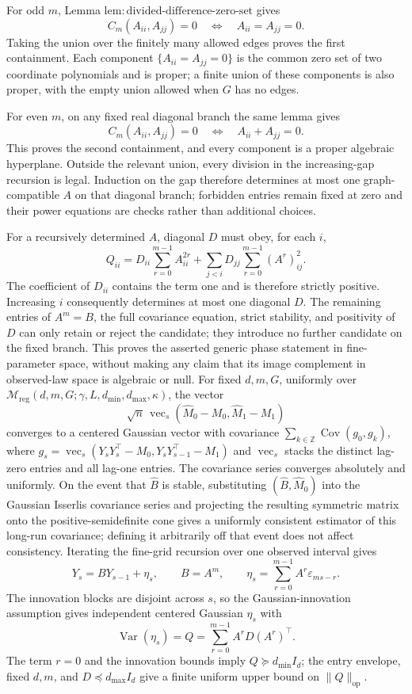For odd \(m\), Lemma \(\mathrm{lem{:}divided\mbox{-}difference\mbox{-}zero\mbox{-}set}\) gives
\[
 C_m(A_{ii},A_{jj})=0
 \quad\Longleftrightarrow\quad
 A_{ii}=A_{jj}=0.
\]
Taking the union over the finitely many allowed edges proves the first containment.  Each component \(\{A_{ii}=A_{jj}=0\}\) is the common zero set of two coordinate polynomials and is proper; a finite union of these components is also proper, with the empty union allowed when \(G\) has no edges.

For even \(m\), on any fixed real diagonal branch the same lemma gives
\[
 C_m(A_{ii},A_{jj})=0
 \quad\Longleftrightarrow\quad
 A_{ii}+A_{jj}=0.
\]
This proves the second containment, and every component is a proper algebraic hyperplane.  Outside the relevant union, every division in the increasing-gap recursion is legal.  Induction on the gap therefore determines at most one graph-compatible \(A\) on that diagonal branch; forbidden entries remain fixed at zero and their power equations are checks rather than additional choices.

For a recursively determined \(A\), diagonal \(D\) must obey, for each \(i\),
\[
 Q_{ii}=D_{ii}\sum_{r=0}^{m-1}A_{ii}^{2r}
 +\sum_{j<i}D_{jj}\sum_{r=0}^{m-1}(A^r)_{ij}^{2}.
\]
The coefficient of \(D_{ii}\) contains the term one and is therefore strictly positive.  Increasing \(i\) consequently determines at most one diagonal \(D\).  The remaining entries of \(A^m=B\), the full covariance equation, strict stability, and positivity of \(D\) can only retain or reject the candidate; they introduce no further candidate on the fixed branch.  This proves the asserted generic phase statement in fine-parameter space, without making any claim that its image complement in observed-law space is algebraic or null.
For fixed \(d,m,G\), uniformly over \(\mathcal M_{\mathrm{reg}}(d,m,G;\gamma,L,d_{\min},d_{\max},\kappa)\), the vector
\[
 \sqrt n\,\operatorname{vec}_{s}\!\left(\widehat M_0-M_0,\widehat M_1-M_1\right)
\]
converges to a centered Gaussian vector with covariance \(\sum_{k\in\mathbb Z}\operatorname{Cov}(g_0,g_k)\), where \(g_s=\operatorname{vec}_{s}(Y_sY_s^\top-M_0,Y_sY_{s-1}^\top-M_1)\) and \(\operatorname{vec}_{s}\) stacks the distinct lag-zero entries and all lag-one entries.  The covariance series converges absolutely and uniformly.  On the event that \(\widehat B\) is stable, substituting \((\widehat B,\widehat M_0)\) into the Gaussian Isserlis covariance series and projecting the resulting symmetric matrix onto the positive-semidefinite cone gives a uniformly consistent estimator of this long-run covariance; defining it arbitrarily off that event does not affect consistency.
Iterating the fine-grid recursion over one observed interval gives
\[
 Y_s=BY_{s-1}+\eta_s,\qquad
 B=A^m,\qquad
 \eta_s=\sum_{r=0}^{m-1}A^r\varepsilon_{ms-r}.
\]
The innovation blocks are disjoint across \(s\), so the Gaussian-innovation assumption gives independent centered Gaussian \(\eta_s\) with
\[
 \operatorname{Var}(\eta_s)=Q=\sum_{r=0}^{m-1}A^rD(A^r)^\top.
\]
The term \(r=0\) and the innovation bounds imply \(Q\succeq d_{\min}I_d\); the entry envelope, fixed \(d,m\), and \(D\preceq d_{\max}I_d\) give a finite uniform upper bound on \(\|Q\|_{\mathrm{op}}\).

